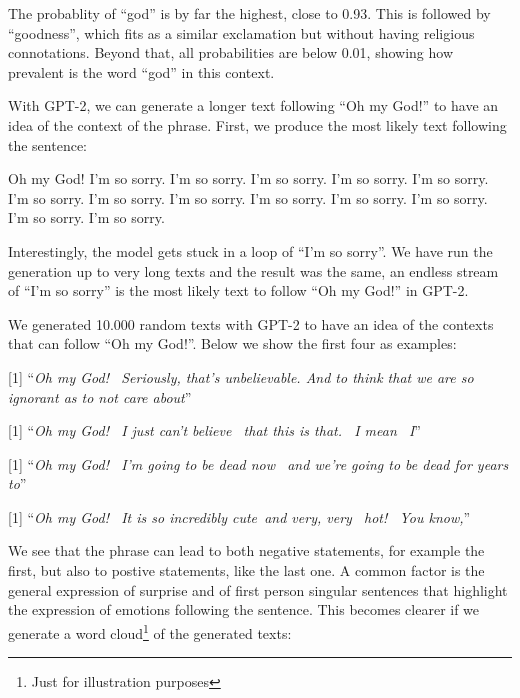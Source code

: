 \documentclass[]{article}
\begin{document}
The probablity of ``god'' is by far the highest, close to 0.93. This is followed by ``goodness'', which fits as a similar exclamation but without having religious connotations. Beyond that, all probabilities are below 0.01, showing how prevalent is the word ``god'' in this context.

With GPT-2, we can generate a longer text following ``Oh my God!'' to have an idea of the context of the phrase. First, we produce the most likely text following the sentence:

{
Oh my God! I'm so sorry. I'm so sorry. I'm so sorry. I'm so sorry. I'm so sorry. I'm so sorry. I'm so sorry. I'm so sorry. I'm so sorry. I'm so sorry. I'm so sorry. I'm so sorry. I'm so sorry.
}

Interestingly, the model gets stuck in a loop of ``I'm so sorry''. We have run the generation up to very long texts and the result was the same, an endless stream of ``I'm so sorry'' is the most likely text to follow ``Oh my God!'' in GPT-2.

We generated 10.000 random texts with GPT-2 to have an idea of the contexts that can follow ``Oh my God!''. Below we show the first four as examples:

{[}1{]} ``\emph{Oh my God! ~Seriously, that's unbelievable. And to think that we are so ignorant as to not care about}''

{[}1{]} ``\emph{Oh my God! ~I just can't believe ~that this is that. ~I mean ~I}''

{[}1{]} ``\emph{Oh my God! ~I'm going to be dead now ~and we're going to be dead for years to}''

{[}1{]} ``\emph{Oh my God! ~It is so incredibly cute~and very, very ~hot! ~You know,}''

\newpage

We see that the phrase can lead to both negative statements, for example the first, but also to postive statements, like the last one. A common factor is the general expression of surprise and of first person singular sentences that highlight the expression of emotions following the sentence. This becomes clearer if we generate a word cloud\footnote{Just for illustration purposes} of the generated texts:

\end{document}
